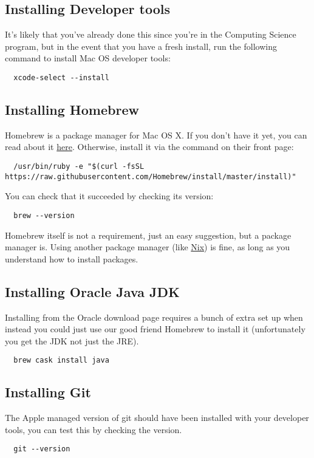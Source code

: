 \documentclass[../setup.tex]{subfiles}
\begin{document}
\subsection{Installing Developer tools}
It's likely that you've already done this since you're in the Computing Science program, but in the
event that you have a fresh install, run the following command to install Mac OS developer tools:
\begin{lstlisting}
  xcode-select --install
\end{lstlisting}

\subsection{Installing Homebrew}
Homebrew is a package manager for Mac OS X. If you don't have it yet, you can read about it
\href{https://brew.sh/} {here}. Otherwise, install it via the command on their front page:
\begin{lstlisting}
  /usr/bin/ruby -e "$(curl -fsSL https://raw.githubusercontent.com/Homebrew/install/master/install)"
\end{lstlisting}
You can check that it succeeded by checking its version:
\begin{lstlisting}
  brew --version
\end{lstlisting}
Homebrew itself is not a requirement, just an easy suggestion, but a package manager is. Using
another package manager (like \href{https://nixos.org/nix/} {Nix}) is fine, as long as you
understand how to install packages.

\subsection{Installing Oracle Java JDK}
Installing from the Oracle download page requires a bunch of extra set up when instead you could
just use our good friend Homebrew to install it (unfortunately you get the JDK not just the JRE).
\begin{lstlisting}
  brew cask install java
\end{lstlisting}

\subsection{Installing Git}
The Apple managed version of git should have been installed with your developer tools, you can test
this by checking the version.
\begin{lstlisting}
  git --version
\end{lstlisting}
\end{document}
